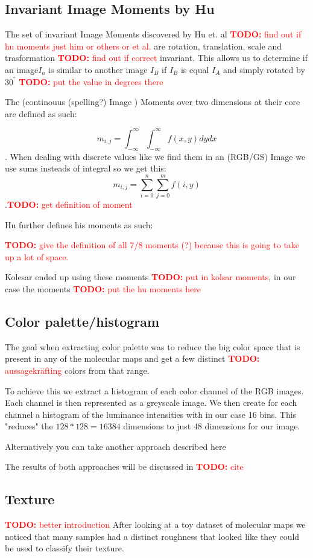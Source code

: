 \documentclass[journal]{vgtc}       %
\newcommand{\todo}[1]{\textcolor{red}{\textbf{TODO:} #1}}
\begin{document}
\subsection{Invariant Image Moments by Hu}\label{subsec:humom}

The set of invariant Image Moments discovered by Hu et. al \todo{find out if hu moments just him or others or et al.} are rotation, translation, scale and trasformation \todo{find out if correct} invariant. This allows us to determine if an image$I_a$ is similar to another image $I_B$ if $I_B$ is equal $I_A$ and simply rotated by $30^°$ \todo{put the value in degrees there}

The (continouus (spelling?)  Image ) Moments  over two dimensions at their core are defined as such:

\[m_{i,j} = \int^\infty_{- \infty}\int^\infty_{- \infty} f(x,y) dy dx \]. When dealing with discrete values like we find them in an (RGB/GS) Image we use sums insteads of integral so we get this:
\[m_{i,j} = \sum^n_{i=0}\sum^m_{j=0} f(i,y) \].\todo{get definition of moment}

Hu further defines his moments as such:

\todo{give the definition of all 7/8 moments (?) because this is going to take up a lot of space. }

Kolesar ended up using these moments \todo{put in kolsar moments}, in our case the moments \todo{put the hu moments here}

\subsection{Color palette/histogram }

The goal when extracting color palette was to reduce the big color space that is present in any of the molecular maps and get a few distinct \todo{aussagekräfting} colors from that range.

To achieve this we extract a histogram of each color channel of the RGB images. Each channel is then represented as a greyscale image. We then create for each channel a histogram of the luminance intensities with in our case 16 bins. This "reduces" the \(128*128 = 16384\) dimensions to just \(48\) dimensions for our image.

Alternatively you can take another approach described here

The results of both approaches will be discussed in \todo{cite}

\subsection{Texture}
\todo{better introduction}
After looking at a toy dataset of molecular maps we noticed that many samples had a distinct roughness that looked like they could be used to classify their texture.
\end{document}
